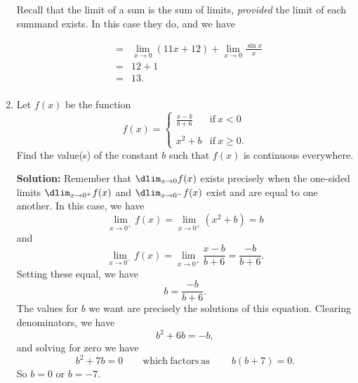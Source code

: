 \documentclass{article}
\begin{document}
\begin{enumerate}
Recall that the limit of a sum is the sum of limits, \emph{provided} the limit of each summand exists. In this case they do, and we have

\begin{eqnarray*}
 & = & \lim_{x \rightarrow 0} \left( 11 x + 12 \right) + \lim_{x \rightarrow 0} \frac{\sin x}{x} \\
 & = & 12 + 1 \\
 & = & 13. \\
\end{eqnarray*}


  
\vspace{1cm}

\item Let $f(x)$ be the function \[ f(x) = \left\{ \begin{array}{ll} \frac{x-b}{b + 6} & \mathrm{if}\ x < 0 \\ & \\ x^2 + b & \mathrm{if}\ x \geq 0. \end{array}\right. \] Find the value(s) of the constant $b$ such that $f(x)$ is continuous everywhere.

\textbf{Solution:} Remember that $\dlim_{x \rightarrow 0} f(x)$ exists precisely when the one-sided limits $\dlim_{x \rightarrow 0^+} f(x)$ and $\dlim_{x \rightarrow 0^-} f(x)$ exist and are equal to one another. In this case, we have \[ \lim_{x \rightarrow 0^+} f(x) = \lim_{x \rightarrow 0^+} (x^2 + b) = b \] and \[ \lim_{x \rightarrow 0^-} f(x) = \lim_{x \rightarrow 0^+} \frac{x-b}{b + 6} = \frac{-b}{b + 6}. \]
Setting these equal, we have \[ b = \frac{-b}{b + 6}. \]
The values for $b$ we want are precisely the solutions of this equation.
Clearing denominators, we have \[ b^2 + 6 b = -b, \] and solving for zero we have \[ b^2 + 7b = 0 \quad\quad \mathrm{which\ factors\ as}\ \quad\quad b (b + 7) = 0. \]
So $b = 0$ or $b = -7$.

  
\vspace{1cm}
\end{enumerate}
\end{document}
